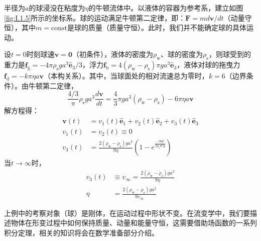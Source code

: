 \documentclass[main.tex]{subfiles}
\begin{document}
\begin{example}[落球粘度计]\label{exp:I.1.5}
半径为$a$的球浸没在粘度为$\eta$的牛顿流体中。以液体的容器为参考系，建立如图\ref{fig:I.1.5}所示的坐标系。球的运动满足牛顿第二定律，即：$\mathbf{F}=md\mathbf{v}/dt$（动量守恒），其中$m=\mathrm{const}$是球的质量（质量守恒）。此时，我们并不能确定球的具体运动。

设$t=0$时刻球速$\mathbf{v}=\mathbf{0}$（初条件），液体的密度为$\rho_\mathrm{w}$、球的密度为$\rho_\mathrm{s}$，则球受到的重力是$\mathbf{f}_\mathrm{g}=-4\pi\rho_\mathrm{s}ga^3\mathbf{\hat{e}}_3/3$，浮力$\mathbf{f}_\mathrm{b}=4\left(\rho_\mathrm{w}-\rho_\mathrm{s}\right)\pi ga^3\mathbf{\hat{e}}_3$，液体对球的拖曳力$\mathbf{f}_\mathrm{d}=-k\pi\eta a\mathbf{v}$（本构关系）。其中，当球面处的相对流速总为零时，$k=6$（边界条件）。由牛顿第二定律，
\[
\frac{4/3}\pi\rho_\mathrm{s}ga^3\frac{d\mathbf{v}}{dt}=\frac{4}{3}\pi ga^3\left(\rho_\mathrm{w}-\rho_\mathrm{s}\right)-6\pi\eta a\mathbf{v}
\]
解方程得：
\begin{align*}
    \mathbf{v}\left(t\right)&=v_1\left(t\right)\mathbf{\hat{e}}_1+v_2\left(t\right)\mathbf{\hat{e}}_2+v_3\left(t\right)\mathbf{\hat{e}}_3\\
    v_1\left(t\right)&=v_2\left(t\right)\equiv0\\
    v_3\left(t\right)&=\frac{2\left(\rho_\mathrm{w}-\rho_\mathrm{s}\right)ga^3}{9\eta}\left(1-e^{\frac{-9\eta t}{2\rho_\mathrm{s}a^2g}}\right)
\end{align*}
当$t\rightarrow\infty$时，
\begin{align*}
v_3\left(t\right)&\equiv v_\infty= \frac{2\left(\rho_\mathrm{w}-\rho_\mathrm{s}\right)ga^2}{9\eta}\\
\eta&=\frac{2\left(\rho_\mathrm{w}-\rho_\mathrm{s}\right)ga^2}{9v_\infty}
\end{align*}
\end{example}

上例中的考察对象（球）是刚体，在运动过程中形状不变。在流变学中，我们要描述物体在形变过程中如何保持质量、动量和能量守恒，这需要借助场函数的一系列积分定理，相关的知识将会在数学准备部分介绍。
\end{document}
